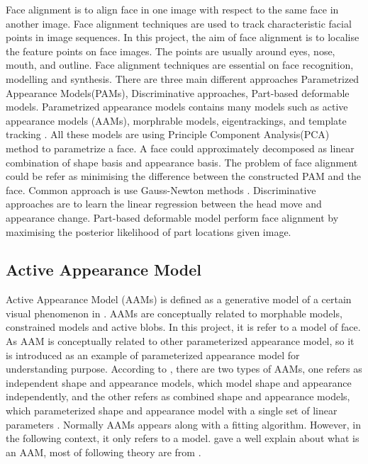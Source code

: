Face alignment is to align face in one image with respect to the same face in another image. Face alignment techniques are used to track characteristic facial points in image sequences. In this project, the aim of face alignment is to localise the feature points on face images. The points are usually around eyes, nose, mouth, and outline. Face alignment techniques are essential on face recognition, modelling and synthesis. There are three main different approaches Parametrized Appearance Models(PAMs), Discriminative approaches, Part-based deformable models. Parametrized appearance models contains many models such as active appearance models (AAMs), morphrable models, eigentrackings, and template tracking \cite{xiong2013supervised}. All these models are using Principle Component Analysis(PCA) method to parametrize a face. A face could approximately decomposed as linear combination of shape basis and appearance basis. The problem of face alignment could be refer as minimising the difference between the constructed PAM and the face. Common approach is use Gauss-Newton methods \cite{xiong2013supervised}. Discriminative approaches are to learn the linear regression between the head move and appearance change. Part-based deformable model perform face alignment by maximising the posterior likelihood of part locations given image\cite{xiong2013supervised}.

\subsection{Active Appearance Model}
Active Appearance Model (AAMs) is defined as a generative model of a certain visual phenomenon in \cite{matthews2004active}. AAMs are conceptually related to morphable models, constrained models and active blobs. In this project, it is refer to a model of face. As AAM is conceptually related to other parameterized appearance model, so it is introduced as an example of parameterized appearance model for understanding purpose. According to \cite{matthews2004active}, there are two types of AAMs, one refers as independent shape and appearance models, which model shape and appearance independently, and the other refers as combined shape and appearance models, which parameterized shape and appearance model with a single set of linear parameters \cite{matthews2004active}. Normally AAMs appears along with a fitting algorithm. However, in the following context, it only refers to a model.\cite{matthews2004active} gave a well explain about what is an AAM, most of following theory are from \cite{matthews2004active}.

